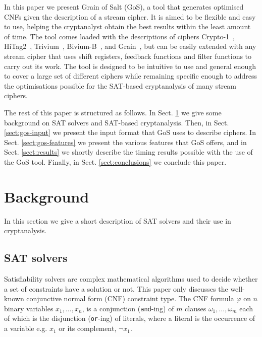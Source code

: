 \documentclass{llncs}
\begin{document}
In this paper we present Grain of Salt (GoS), a tool that generates optimised CNFs given the description of a stream cipher. It is aimed to be flexible and easy to use, helping the cryptanalyst obtain the best results within the least amount of time. The tool comes loaded with the descriptions of ciphers Crypto-1~\cite{DBLP:conf/esorics/GarciaGMRVSJ08}, HiTag2~\cite{DBLP:conf/isw/CourtoisOQ09}, Trivium~\cite{Canniere06Trivium}, Bivium-B~\cite{Bivium}, and Grain~\cite{DBLP:journals/ijwmc/HellJM07}, but can be easily extended with any stream cipher that uses shift registers, feedback functions and filter functions to carry out its work. The tool is designed to be intuitive to use and general enough to cover a large set of different ciphers while remaining specific enough to address the optimisations possible for the SAT-based cryptanalysis of many stream ciphers.

The rest of this paper is structured as follows. In Sect. \ref{sect:background} we give some background on SAT solvers and SAT-based cryptanalysis. Then, in Sect. \ref{sect:gos-input} we present the input format that GoS uses to describe ciphers. In Sect. \ref{sect:gos-features} we present the various features that GoS offers, and in Sect. \ref{sect:results} we shortly describe the timing results possible with the use of the GoS tool. Finally, in Sect. \ref{sect:conclusions} we conclude this paper.

\section{Background}
\label{sect:background}
In this section we give a short description of SAT solvers and their use in cryptanalysis.%

\subsection{SAT solvers}
Satisfiability solvers are complex mathematical algorithms used to decide whether a set of constraints have a solution or not. This paper only discusses the well-known conjunctive normal form (CNF) constraint type. The CNF formula $\varphi$ on $n$ binary variables $x_1,\ldots, x_n$, is a conjunction (\texttt{and}-ing) of $m$ clauses $\omega_1,\ldots, \omega_m$ each of which is the disjunction (\texttt{or}-ing) of literals, where a literal is the occurrence of a variable e.g. $x_1$ or its complement, $\neg x_1$.
\end{document}
